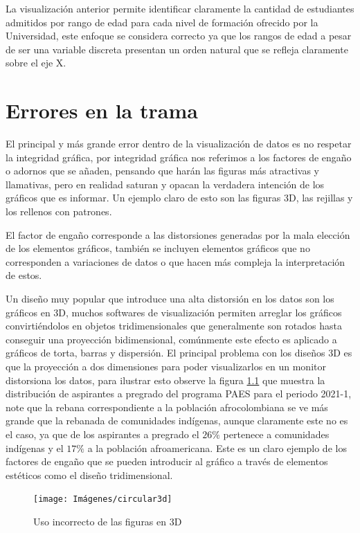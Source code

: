 \documentclass[
]{book}
\begin{document}
La visualización anterior permite identificar claramente la cantidad de estudiantes admitidos por rango de edad para cada nivel de formación ofrecido por la Universidad, este enfoque se considera correcto ya que los rangos de edad a pesar de ser una variable discreta presentan un orden natural que se refleja claramente sobre el eje X.

\hypertarget{errores-en-la-trama}{%
\chapter{Errores en la trama}\label{errores-en-la-trama}}

El principal y más grande error dentro de la visualización de datos es no respetar la integridad gráfica, por integridad gráfica nos referimos a los factores de engaño o adornos que se añaden, pensando que harán las figuras más atractivas y llamativas, pero en realidad saturan y opacan la verdadera intención de los gráficos que es informar. Un ejemplo claro de esto son las figuras 3D, las rejillas y los rellenos con patrones.

El factor de engaño corresponde a las distorsiones generadas por la mala elección de los elementos gráficos, también se incluyen elementos gráficos que no corresponden a variaciones de datos o que hacen más compleja la interpretación de estos.

Un diseño muy popular que introduce una alta distorsión en los datos son los gráficos en 3D, muchos softwares de visualización permiten arreglar los gráficos convirtiéndolos en objetos tridimensionales que generalmente son rotados hasta conseguir una proyección bidimensional, comúnmente este efecto es aplicado a gráficos de torta, barras y dispersión. El principal problema con los diseños 3D es que la proyección a dos dimensiones para poder visualizarlos en un monitor distorsiona los datos, para ilustrar esto observe la figura \ref{fig:circular3d-fig} que muestra la distribución de aspirantes a pregrado del programa PAES para el periodo 2021-1, note que la rebana correspondiente a la población afrocolombiana se ve más grande que la rebanada de comunidades indígenas, aunque claramente este no es el caso, ya que de los aspirantes a pregrado el \(26\%\) pertenece a comunidades indígenas y el \(17\%\) a la población afroamericana. Este es un claro ejemplo de los factores de engaño que se pueden introducir al gráfico a través de elementos estéticos como el diseño tridimensional.

\begin{figure}

{\centering \texttt{[image: Imágenes/circular3d]} 

}

\caption{Uso incorrecto de las figuras en 3D}\label{fig:circular3d-fig}
\end{figure}
\end{document}
